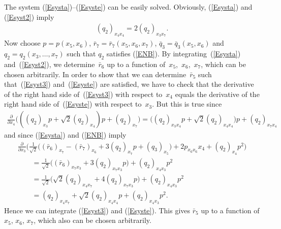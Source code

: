 \begin{Remark} \label{34}The system (\ref{Esysta})--(\ref{Esyste}) can be easily solved. Obviously, (\ref{Esysta}) and (\ref{Esyst2}) imply
\begin{gather}
(q_2)_{x_4 x_4} =2 (q_2)_{x_3 x_7}. \label{ENB}
\end{gather}
Now choose $p=p(x_5,x_6)$, $\bar r_7=\bar r_7(x_5,x_6,x_7)$, $\bar q_3=\bar q_3(x_5,x_6)$ and $q_2=q_2(x_3,\dots,x_7)$ such that $q_2$ satisfies (\ref{ENB}). By integrating~(\ref{Esysta}) and~(\ref{Esyst2}), we determine~$\bar r_6$ up to a function of~$x_5$,~$x_6$,~$x_7$, which can be chosen arbitrarily. In order to show that we can determine~$\bar r_5$ such that~(\ref{Esyst3}) and~(\ref{Esyste}) are satisfied, we have to check that the derivative of the right hand side of~(\ref{Esyst3}) with respect to~$x_4$ equals the derivative of the right hand side of~(\ref{Esyste}) with respect to~$x_3$. But this is true since
\begin{gather*} \frac{\partial}{\partial x_4} \big(((q_2)_{x_3}p+ {\sqrt2}(q_2)_{x_4})p+ (q_2)_{x_7}\big)=\big((q_2)_{x_3x_4}p+ {\sqrt2}(q_2)_{x_4x_4}\big)p+ (q_2)_{x_7x_4}\end{gather*}
and since (\ref{Esysta}) and (\ref{ENB}) imply
\begin{gather*}
 \frac{\partial}{\partial x_3}\big(\tfrac 1{\sqrt2} \big((\bar r_6)_{x_7} - (\bar r_7)_{x_6} +3 (q_2)_{x_7}p +(q_3)_{x_5}\big) +2p_{x_6 x_6} x_4 +(q_2)_{x_4} p^2\big) \\
 \qquad{} = \tfrac 1{\sqrt2}\big((\bar r_6)_{x_7x_3} +3 (q_2)_{x_7x_3}p\big) +(q_2)_{x_4x_3} p^2\\
\qquad{} = \tfrac 1{\sqrt2}\big(\sqrt2(q_2)_{x_4x_7} +4 (q_2)_{x_7x_3}p\big) +(q_2)_{x_4x_3} p^2\\
\qquad{} = (q_2)_{x_4x_7} +\sqrt2 (q_2)_{x_4x_4}p +(q_2)_{x_4x_3} p^2.
\end{gather*}
Hence we can integrate (\ref{Esyst3}) and (\ref{Esyste}). This gives $\bar r_5$ up to a function of $x_5$, $x_6$, $x_7$, which also can be chosen arbitrarily.
\end{Remark}


